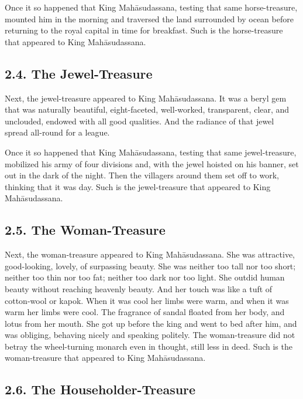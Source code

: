 \documentclass[12pt,openany]{book}%
\begin{document}
Once it so happened that King \textsanskrit{Mahāsudassana}, testing that same horse-treasure, mounted him in the morning and traversed the land surrounded by ocean before returning to the royal capital in time for breakfast. Such is the horse-treasure that appeared to King \textsanskrit{Mahāsudassana}. 

\subsection*{2.4. The Jewel-Treasure }

Next, the jewel-treasure appeared to King \textsanskrit{Mahāsudassana}. It was a beryl gem that was naturally beautiful, eight-faceted, well-worked, transparent, clear, and unclouded, endowed with all good qualities. And the radiance of that jewel spread all-round for a league. 

Once it so happened that King \textsanskrit{Mahāsudassana}, testing that same jewel-treasure, mobilized his army of four divisions and, with the jewel hoisted on his banner, set out in the dark of the night. Then the villagers around them set off to work, thinking that it was day. Such is the jewel-treasure that appeared to King \textsanskrit{Mahāsudassana}. 

\subsection*{2.5. The Woman-Treasure }

Next, the woman-treasure appeared to King \textsanskrit{Mahāsudassana}. She was attractive, good-looking, lovely, of surpassing beauty. She was neither too tall nor too short; neither too thin nor too fat; neither too dark nor too light. She outdid human beauty without reaching heavenly beauty. And her touch was like a tuft of cotton-wool or kapok. When it was cool her limbs were warm, and when it was warm her limbs were cool. The fragrance of sandal floated from her body, and lotus from her mouth. She got up before the king and went to bed after him, and was obliging, behaving nicely and speaking politely. The woman-treasure did not betray the wheel-turning monarch even in thought, still less in deed. Such is the woman-treasure that appeared to King \textsanskrit{Mahāsudassana}. 

\subsection*{2.6. The Householder-Treasure }
\end{document}
